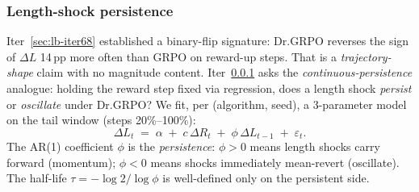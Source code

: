 
\subsubsection{Length-shock persistence}\label{sec:lb-iter72}

Iter~\ref{sec:lb-iter68} established a binary-flip signature: Dr.GRPO
reverses the sign of $\Delta L$ 14\,pp more often than GRPO on reward-up
steps. That is a \emph{trajectory-shape} claim with no magnitude content.
Iter~\ref{sec:lb-iter72} asks the \emph{continuous-persistence} analogue:
holding the reward step fixed via regression, does a length shock
\emph{persist} or \emph{oscillate} under Dr.GRPO? We fit, per
(algorithm, seed), a 3-parameter model on the tail window (steps
20\%--100\%):
\begin{equation}\label{eq:lb72-ar1}
\Delta L_t \;=\; \alpha \;+\; c\, \Delta R_t \;+\; \phi\, \Delta L_{t-1} \;+\; \varepsilon_t .
\end{equation}
The AR(1) coefficient $\phi$ is the \emph{persistence}: $\phi > 0$ means
length shocks carry forward (momentum); $\phi < 0$ means shocks
immediately mean-revert (oscillate). The half-life
$\tau = -\log 2 / \log \phi$ is well-defined only on the persistent side.

